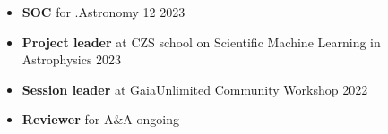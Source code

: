 \begin{itemize}
    \item \textbf{SOC} for .Astronomy 12 \hfill 2023
    \item \textbf{Project leader} at CZS school on Scientific Machine Learning in Astrophysics \hfill 2023
    \item \textbf{Session leader} at GaiaUnlimited Community Workshop \hfill 2022
    \item \textbf{Reviewer} for A\&A \hfill ongoing
\end{itemize}